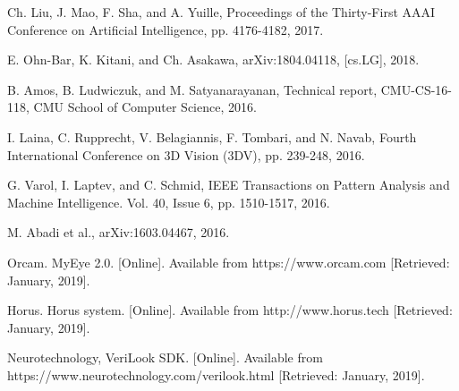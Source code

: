 \documentclass[10pt,conference,compsocconf]{IEEEtran}
\begin{document}
\begin{thebibliography}{99}
 Ch. Liu, J. Mao, F. Sha, and A. Yuille,  Proceedings of the Thirty-First AAAI Conference on Artificial Intelligence, pp. 4176-4182, 2017.

 E. Ohn-Bar, K. Kitani, and Ch. Asakawa,  arXiv:1804.04118, [cs.LG], 2018.




 B. Amos, B. Ludwiczuk, and M. Satyanarayanan,  Technical report, CMU-CS-16-118, CMU School of Computer Science, 2016.


 I. Laina, C. Rupprecht, V. Belagiannis, F. Tombari, and N. Navab,  Fourth International Conference on 3D Vision (3DV), pp. 239-248, 2016.


 G. Varol, I. Laptev, and C. Schmid,   IEEE Transactions on Pattern Analysis and Machine Intelligence. Vol. 40, Issue 6, pp. 1510-1517, 2016.

 M. Abadi et al.,  arXiv:1603.04467, 2016. 


 Orcam. MyEye 2.0. [Online]. Available from https://www.orcam.com [Retrieved: January, 2019].

 Horus. Horus system. [Online]. Available from http://www.horus.tech [Retrieved: January, 2019].

 Neurotechnology, VeriLook SDK. [Online]. Available from https://www.neurotechnology.com/verilook.html [Retrieved: January, 2019].


\end{thebibliography}




\end{document}
